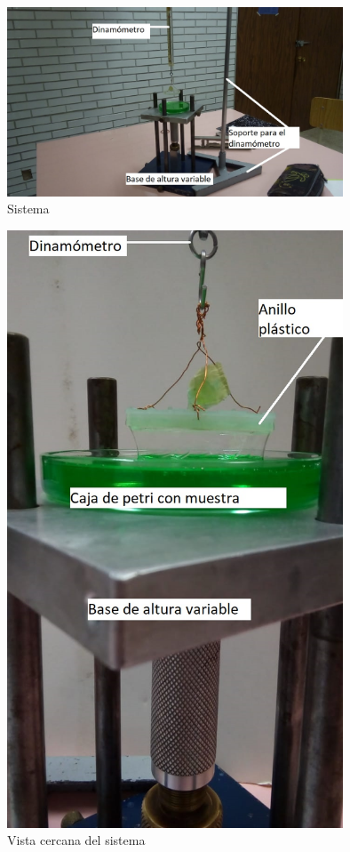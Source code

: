 \documentclass[a4paper]{article}
\begin{document}
\begin{figure}[H]
    \centering
    \includegraphics[width=10cm]{SistemaT-S.jpg}
    \caption{Sistema}
\end{figure}
 
 \begin{figure}[H]
    \centering
    \includegraphics[width=10cm]{S-TS-Zoom.jpg}
    \caption{Vista cercana del sistema}
\end{figure}
 
\end{document}
